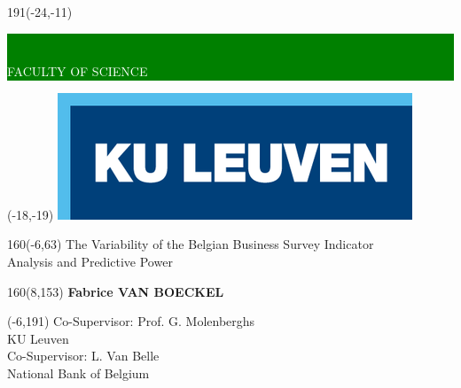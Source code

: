 \documentclass[12pt,a4paper,oneside]{book}
\begin{document}
\thispagestyle{empty}
\newcommand{\form}[1]{\scalebox{1.087}{\boldmath{#1}}}
\sffamily
%
\begin{textblock}{191}(-24,-11)
\colorbox{green}{\hspace{139mm}\ \parbox[c][18truemm]{52mm}{\textcolor{white}{FACULTY OF SCIENCE}}}
\end{textblock}
%
\begin{textblock}{70}(-18,-19)
\textblockcolour{}
\includegraphics*[height=19.8truemm]{Images/LogoKULeuven.png}
\end{textblock}
%
\begin{textblock}{160}(-6,63)
\textblockcolour{}
\vspace{-\parskip}
\flushleft
\fontsize{40}{42}\selectfont \textcolor{bluetitle}{The Variability of the Belgian Business Survey Indicator}\\[1.5mm]
\fontsize{20}{22}\selectfont Analysis and Predictive Power
\end{textblock}
%
\begin{textblock}{160}(8,153)
\textblockcolour{}
\vspace{-\parskip}
\flushright
\fontsize{14}{16}\selectfont \textbf{Fabrice VAN BOECKEL}
\end{textblock}
%
\begin{textblock}{70}(-6,191)
\textblockcolour{}
\vspace{-\parskip}
\flushleft
Co-Supervisor: Prof. G. Molenberghs\\[-2pt]
\textcolor{blueaff}{KU Leuven}\\[5pt]
Co-Supervisor: L. Van Belle\\[-2pt]
\textcolor{blueaff}{National Bank of Belgium}\\[5pt]
\end{textblock}
\end{document}
